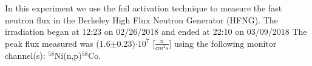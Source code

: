 In this experiment we use the foil activation technique to measure the fast neutron flux in the Berkeley High Flux Neutron Generator (HFNG).  The irradiation began at 12:23 on 02/26/2018 and ended at 22:10 on 03/09/2018  The peak flux measured was (1.6$\pm$0.23)$\cdot 10^7$ [$\frac{n}{cm^2s}$] using the following monitor channel(s): $^{58}$Ni(n,p)$^{58}$Co.